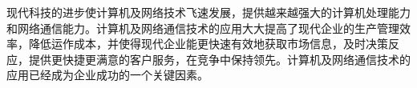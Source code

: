 

现代科技的进步使计算机及网络技术飞速发展，提供越来越强大的计算机处理能力和网络通信能力。计算机及网络通信技术的应用大大提高了现代企业的生产管理效率，降低运作成本，并使得现代企业能更快速有效地获取市场信息，及时决策反应，提供更快捷更满意的客户服务，在竞争中保持领先。计算机及网络通信技术的应用已经成为企业成功的一个关键因素。
